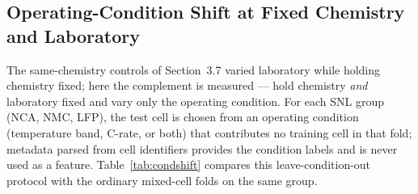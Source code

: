 \documentclass[preprint,12pt]{elsarticle}
\begin{document}
\begin{table}[!t]
\caption{Transfer to New Chemistries at H=20 (NASA+CALCE Source). Pooled AUC With Cell-Level Bootstrap 95\% CI; $\Delta$ Is the Paired Per-Cell Bootstrap Difference (With $-$ Without SOH). New Groups Are Transfer Targets Only.}
\label{tab:crosschemnew}
\centering
{}
\end{table}

\subsection{Operating-Condition Shift at Fixed Chemistry and Laboratory}
The same-chemistry controls of Section~3.7 varied laboratory while holding chemistry fixed; here the complement is measured --- hold chemistry \emph{and} laboratory fixed and vary only the operating condition. For each SNL group (NCA, NMC, LFP), the test cell is chosen from an operating condition (temperature band, C-rate, or both) that contributes no training cell in that fold; metadata parsed from cell identifiers provides the condition labels and is never used as a feature. Table~\ref{tab:condshift} compares this leave-condition-out protocol with the ordinary mixed-cell folds on the same group.
\end{document}
